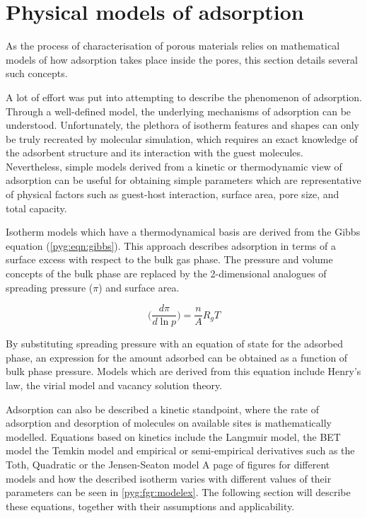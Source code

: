 
\section{Physical models of adsorption}%
\label{pyg:models}

As the process of characterisation of porous materials
relies on mathematical models of how adsorption
takes place inside the pores, this section details
several such concepts.

A lot of effort was put into attempting to describe
the phenomenon of adsorption. Through a well-defined
model, the underlying mechanisms of adsorption can be
understood. Unfortunately, the plethora of isotherm
features and shapes can only be truly recreated
by molecular simulation, which requires an exact
knowledge of the adsorbent structure and its interaction
with the guest molecules. 
Nevertheless, simple models derived from a kinetic or thermodynamic
view of adsorption can be useful for obtaining simple parameters
which are representative of physical factors such as
guest-host interaction, surface area, pore size,
and total capacity.

Isotherm models which have a thermodynamical basis are derived
from the Gibbs equation (\autoref{pyg:eqn:gibbs}). This approach
describes adsorption in terms of a surface excess with respect 
to the bulk gas phase. The pressure and volume concepts of the bulk phase
are replaced by the 2-dimensional analogues of spreading pressure (\( \pi \))
and surface area.

\begin{equation}\label{pyg:eqn:gibbs}
	\Big(\frac{d\pi}{d\ln{p}}\Big) = \frac{n}{A} R_g T
\end{equation}

By substituting spreading pressure with an equation
of state for the adsorbed phase, an expression for the amount
adsorbed can be obtained as a function of bulk phase pressure.
Models which are derived from this equation include
Henry's law, the virial model and vacancy solution theory.

Adsorption can also be described a kinetic standpoint, where 
the rate of adsorption and desorption of molecules on 
available sites is mathematically modelled. Equations based
on kinetics include the Langmuir model, the BET model
the Temkin model and empirical or semi-empirical derivatives 
such as the Toth, Quadratic or the Jensen-Seaton model
A page of figures for different models and how the 
described isotherm varies with different values of
their parameters can be seen in
\autoref{pyg:fgr:modelex}. The following section will describe
these equations, together with their assumptions and 
applicability.

